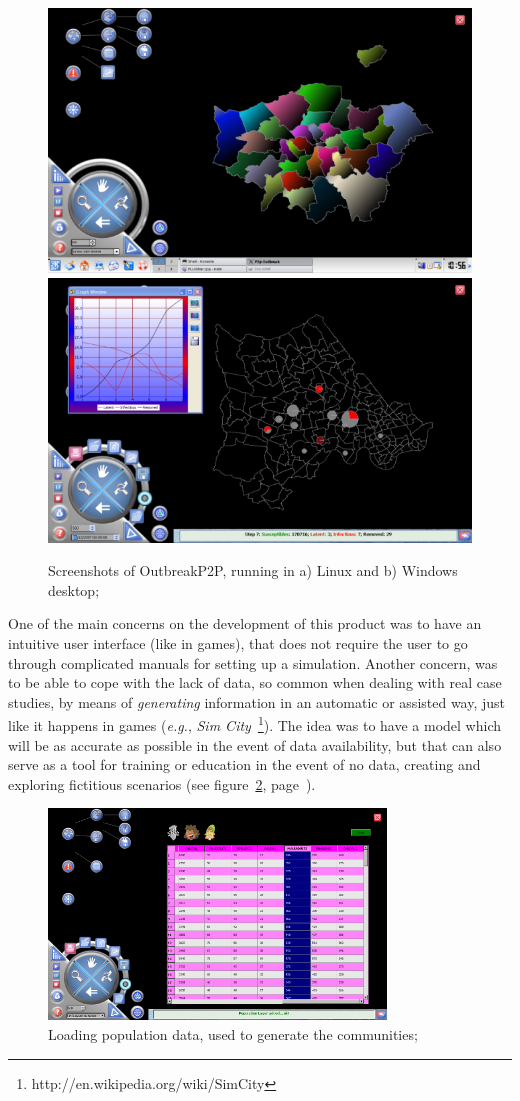 \documentclass[printer]{tGIS2e}
\begin{document}
\begin{figure}[!ht]
\centering
\includegraphics[height=0.3\textwidth]{pics/linuxScreen}
\subfigure[]{{}} 
\includegraphics[height=0.3\textwidth]{pics/winScreen}
\subfigure[]{{}} 
\caption[Screenshots of OutbreakP2P, running in a) Linux and b) Windows desktop;]{Screenshots of OutbreakP2P, running in a) Linux and b) Windows desktop;}
\label{1:02} %
\end{figure}
One of the main concerns on the development of this product was to have an intuitive user interface (like in games), that does not require the user to go through complicated manuals for setting up a simulation. Another concern, was to be able to cope with the lack of data, so common when dealing with real case studies, by means of \textit{generating} information in an automatic or assisted way, just like it happens in games (\textit{e.g.}, \textit{Sim City}~\footnote{http://en.wikipedia.org/wiki/SimCity}). The idea was to have a model which will be as accurate as possible in the event of data availability, but that can  also serve as a tool for training or education in the event of no data, creating and exploring fictitious scenarios (see figure~\ref{1:03}, page~\pageref{1:03}).\\

  \begin{figure}[!ht]%
   \begin{center} 
	\includegraphics[width=0.8\textwidth]{pics/load_population}
      \caption[Loading population data, used to generate the communities;]{Loading population data, used to generate the communities;}
      \label{1:03} %
    \end{center} 
  \end{figure}
\end{document}
